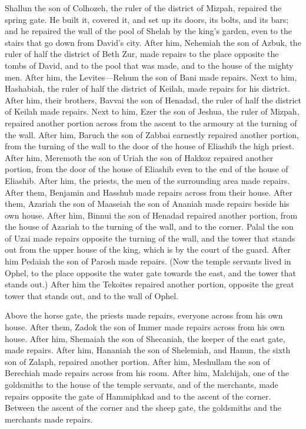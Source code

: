  Shallun the son of Colhozeh, the ruler of the district
of Mizpah, repaired the spring gate. He built it, covered it, and set up
its doors, its bolts, and its bars; and he repaired the wall of the pool
of Shelah by the king's garden, even to the stairs that go down from
David's city.  After him, Nehemiah the son of Azbuk, the
ruler of half the district of Beth Zur, made repairs to the place
opposite the tombs of David, and to the pool that was made, and to the
house of the mighty men.  After him, the Levites---Rehum
the son of Bani made repairs. Next to him, Hashabiah, the ruler of half
the district of Keilah, made repairs for his district. 
After him, their brothers, Bavvai the son of Henadad, the ruler of half
the district of Keilah made repairs.  Next to him, Ezer
the son of Jeshua, the ruler of Mizpah, repaired another portion across
from the ascent to the armoury at the turning of the wall.
 After him, Baruch the son of Zabbai earnestly repaired
another portion, from the turning of the wall to the door of the house
of Eliashib the high priest.  After him, Meremoth the son
of Uriah the son of Hakkoz repaired another portion, from the door of
the house of Eliashib even to the end of the house of Eliashib.
 After him, the priests, the men of the surrounding area
made repairs.  After them, Benjamin and Hasshub made
repairs across from their house. After them, Azariah the son of Maaseiah
the son of Ananiah made repairs beside his own house. 
After him, Binnui the son of Henadad repaired another portion, from the
house of Azariah to the turning of the wall, and to the corner.
 Palal the son of Uzai made repairs opposite the turning
of the wall, and the tower that stands out from the upper house of the
king, which is by the court of the guard. After him Pedaiah the son of
Parosh made repairs.  (Now the temple servants lived in
Ophel, to the place opposite the water gate towards the east, and the
tower that stands out.)  After him the Tekoites repaired
another portion, opposite the great tower that stands out, and to the
wall of Ophel.

 Above the horse gate, the priests made repairs, everyone
across from his own house.  After them, Zadok the son of
Immer made repairs across from his own house. After him, Shemaiah the
son of Shecaniah, the keeper of the east gate, made repairs.
 After him, Hananiah the son of Shelemiah, and Hanun, the
sixth son of Zalaph, repaired another portion. After him, Meshullam the
son of Berechiah made repairs across from his room. 
After him, Malchijah, one of the goldsmiths to the house of the temple
servants, and of the merchants, made repairs opposite the gate of
Hammiphkad and to the ascent of the corner.  Between the
ascent of the corner and the sheep gate, the goldsmiths and the
merchants made repairs.

